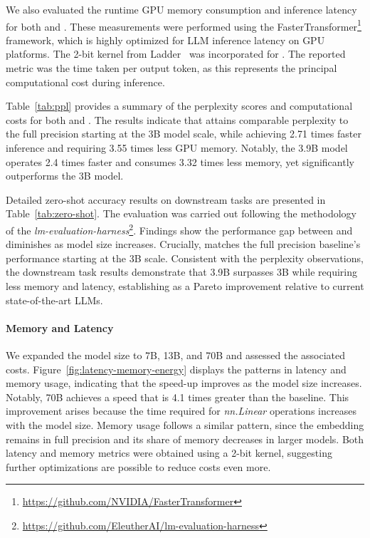 We also evaluated the runtime GPU memory consumption and inference latency for both  and . These measurements were performed using the FasterTransformer\footnote{\url{https://github.com/NVIDIA/FasterTransformer}} framework, which is highly optimized for LLM inference latency on GPU platforms. The 2-bit kernel from Ladder~\cite{ladder} was incorporated for . The reported metric was the time taken per output token, as this represents the principal computational cost during inference.

Table~\ref{tab:ppl} provides a summary of the perplexity scores and computational costs for both  and . The results indicate that  attains comparable perplexity to the full precision  starting at the 3B model scale, while achieving 2.71 times faster inference and requiring 3.55 times less GPU memory. Notably, the 3.9B  model operates 2.4 times faster and consumes 3.32 times less memory, yet significantly outperforms the  3B model.

Detailed zero-shot accuracy results on downstream tasks are presented in Table~\ref{tab:zero-shot}. The evaluation was carried out following the methodology of the \emph{lm-evaluation-harness}\footnote{\url{https://github.com/EleutherAI/lm-evaluation-harness}}. Findings show the performance gap between  and  diminishes as model size increases. Crucially,  matches the full precision baseline’s performance starting at the 3B scale. Consistent with the perplexity observations, the downstream task results demonstrate that  3.9B surpasses  3B while requiring less memory and latency, establishing  as a Pareto improvement relative to current state-of-the-art LLMs.

\paragraph{Memory and Latency}

We expanded the model size to 7B, 13B, and 70B and assessed the associated costs. Figure~\ref{fig:latency-memory-energy} displays the patterns in latency and memory usage, indicating that the speed-up improves as the model size increases. Notably,  70B achieves a speed that is 4.1 times greater than the  baseline. This improvement arises because the time required for \emph{nn.Linear} operations increases with the model size. Memory usage follows a similar pattern, since the embedding remains in full precision and its share of memory decreases in larger models. Both latency and memory metrics were obtained using a 2-bit kernel, suggesting further optimizations are possible to reduce costs even more.

